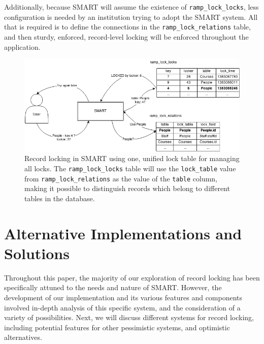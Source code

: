 \documentclass[12pt]{article}
\newcommand{\code}[1]{\texttt{#1}}
\begin{document}
Additionally, because SMART will assume the existence of \code{ramp\_lock\_locks}, less configuration is needed by an institution trying to adopt the SMART system. All that is required is to define the connections in the \code{ramp\_lock\_relations} table, and then sturdy, enforced, record-level locking will be enforced throughout the application.

\begin{center}
\begin{figure}[h]
    \centering
    \centerline{\includegraphics[width=7in]{diagrams/UnifiedLockDesign.png}}
    \begin{spacing}{1.0}\caption{Record locking in SMART using one, unified lock table for managing all locks. The \code{ramp\_lock\_locks} table will use the \code{lock\_table} value from \code{ramp\_lock\_relations} as the value of the \code{table} column, making it possible to distinguish records which belong to different tables in the database.}\end{spacing}
\end{figure}
\end{center}

\newpage
\section{Alternative Implementations and Solutions}

Throughout this paper, the majority of our exploration of record locking has been specifically attuned to the needs and nature of SMART. However, the development of our implementation and its various features and components involved in-depth analysis of this specific system, and the consideration of a variety of possibilities. Next, we will discuss different systems for record locking, including potential features for other pessimistic systems, and optimistic alternatives.
\end{document}

